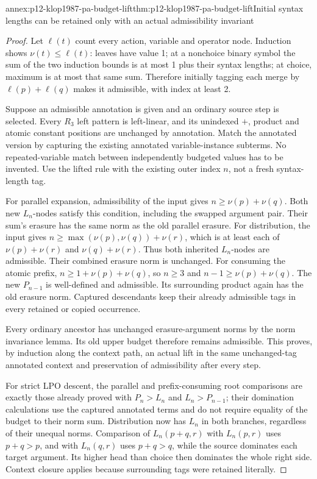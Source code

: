 \begin{annexitem}{annex:p12-klop1987-pa-budget-lift}{thm:p12-klop1987-pa-budget-lift}{Initial syntax lengths can be retained only with an actual admissibility invariant}
\begin{proof}
Let \(\ell(t)\) count every action, variable and operator node.
Induction shows \(\nu(t)\leq\ell(t)\): leaves have value 1;
at a nonchoice binary symbol the sum of the two induction bounds
is at most 1 plus their syntax lengths; at choice, maximum is at
most that same sum. Therefore initially tagging each merge by
\(\ell(p)+\ell(q)\) makes it admissible, with index at least 2.

Suppose an admissible annotation is given and an ordinary source
step is selected. Every \(R_3\) left pattern is left-linear,
and its unindexed \(+\), product and atomic constant positions
are unchanged by annotation. Match the annotated version by
capturing the existing annotated variable-instance subterms.
No repeated-variable match between independently budgeted values
has to be invented. Use the lifted rule with the existing outer
index \(n\), not a fresh syntax-length tag.

For parallel expansion, admissibility of the input gives
\(n\geq\nu(p)+\nu(q)\). Both new \(L_n\)-nodes satisfy
this condition, including the swapped argument pair. Their sum's
erasure has the same norm as the old parallel erasure.
For distribution, the input gives
\(n\geq\max(\nu(p),\nu(q))+\nu(r)\), which is at least
each of \(\nu(p)+\nu(r)\) and \(\nu(q)+\nu(r)\).
Thus both inherited \(L_n\)-nodes are admissible. Their combined
erasure norm is unchanged. For consuming the atomic prefix,
\(n\geq1+\nu(p)+\nu(q)\), so \(n\geq3\) and
\(n-1\geq\nu(p)+\nu(q)\). The new \(P_{n-1}\) is
well-defined and admissible. Its surrounding product again has
the old erasure norm. Captured descendants keep their already
admissible tags in every retained or copied occurrence.

Every ordinary ancestor has unchanged erasure-argument norms by
the norm invariance lemma. Its old upper budget therefore remains
admissible. This proves, by induction along the context path, an
actual lift in the same unchanged-tag annotated context and
preservation of admissibility after every step.

For strict LPO descent, the parallel and prefix-consuming root
comparisons are exactly those already proved with \(P_n>L_n\)
and \(L_n>P_{n-1}\); their domination calculations use the
captured annotated terms and do not require equality of the
budget to their norm sum. Distribution now has \(L_n\) in
both branches, regardless of their unequal norms. Comparison
of \(L_n(p+q,r)\) with \(L_n(p,r)\) uses \(p+q>p\),
and with \(L_n(q,r)\) uses \(p+q>q\), while the source
dominates each target argument. Its higher head than choice
then dominates the whole right side. Context closure applies
because surrounding tags were retained literally.


\end{proof}
\end{annexitem}
